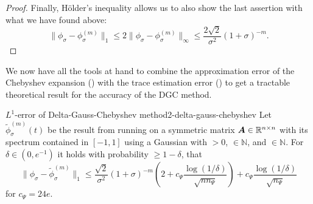 \begin{proof}
    Finally, H\"older's inequality \cite{klenke2013probability} 
    allows us to also show the last assertion with what we have found above:
    \begin{equation}
        \lVert \phi_{\sigma} - \phi_{\sigma}^{(m)} \rVert _1
            \leq 2 \lVert \phi_{\sigma} - \phi_{\sigma}^{(m)} \rVert _{\infty}
            \leq \frac{2\sqrt{2}}{\sigma^2} (1 + \sigma)^{-m}.
    \end{equation}
\end{proof}

We now have all the tools at hand to combine the approximation error of the
Chebyshev expansion () with the trace estimation
error () to get a tractable theoretical
result for the accuracy of the \gls{DGC} method.

\begin{theorem}{$L^1$-error of Delta-Gauss-Chebyshev method}{2-delta-gauss-chebyshev}
    Let $\widetilde{\phi}_{\sigma}^{(m)}(t)$ be the result from running 
    on a symmetric matrix $\boldsymbol{A} \in \mathbb{R}^{n \times n}$ with its spectrum contained in $[-1, 1]$ using
    a Gaussian  with
     $>0$,  $\in \mathbb{N}$, and
     $\in \mathbb{N}$. For $\delta \in (0, e^{-1})$ it holds with
    probability $\geq 1-\delta$, that
    \begin{equation}
        \lVert \phi_{\sigma} - \widetilde{\phi}_{\sigma}^{(m)}\rVert _1
        \leq \frac{\sqrt{2}}{\sigma^2} (1 + \sigma)^{-m} \left( 2 + c_{\Psi} \frac{\log(1/\delta)}{\sqrt{n n_{\Psi}}} \right) + c_{\Psi} \frac{\log(1/\delta)}{\sqrt{n_{\Psi}}}
    \end{equation}
    for $c_{\Psi} = 24e$.
\end{theorem}

